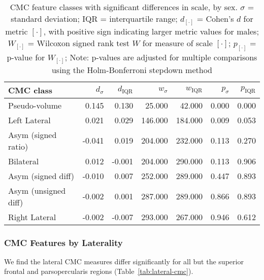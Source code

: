 \documentclass{article}
\begin{document}
\begin{table}
\centering
\begin{tabular}{lrrrrrr}
	\toprule
	CMC class & \(d_{\sigma}\) & \(d_\text{IQR}\)  & \(w_{\sigma}\) & \(w_\text{IQR}\)   & \(p_{\sigma}\)   & \(p_\text{IQR}\) \\
	\midrule
	Pseudo-volume        &  0.145 &  0.130 &  25.000 &  42.000 & 0.000 & 0.000 \\
	Left Lateral         &  0.021 &  0.029 & 146.000 & 184.000 & 0.009 & 0.053 \\
	Asym (signed ratio)  & -0.041 &  0.019 & 204.000 & 232.000 & 0.113 & 0.270 \\
	Bilateral            &  0.012 & -0.001 & 204.000 & 290.000 & 0.113 & 0.906 \\
	Asym (signed diff)   & -0.010 &  0.007 & 252.000 & 289.000 & 0.447 & 0.893 \\
	Asym (unsigned diff) & -0.002 &  0.001 & 287.000 & 289.000 & 0.866 & 0.893 \\
	Right Lateral        & -0.002 & -0.007 & 293.000 & 267.000 & 0.946 & 0.612 \\
	\bottomrule
\end{tabular}
\footnotesize
\caption{CMC feature classes with significant differences in scale, by sex.
\(\sigma\) = standard deviation; IQR = interquartile range;
\(d_{[\cdot]}\) = Cohen's \(d\) for metric \([\cdot]\), with positive sign indicating larger metric values for males;
\(W_{[\cdot]}\) = Wilcoxon signed rank test \(W\) for measure of scale \([\cdot]\);
\(p_{[\cdot]}\) = p-value for \(W_{[\cdot]}\);
Note: p-values are adjusted for multiple comparisons using the Holm-Bonferroni stepdown method}
\normalsize
\label{tab:sig-cmc-scale-sex}
\end{table}


\subsubsection{CMC Features by Laterality}

We find the lateral CMC measures differ significantly for all but the
superior frontal and parsopercularis regions (Table~\ref{tab:lateral-cmc}).
\end{document}
